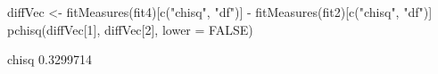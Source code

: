 \begin{Schunk}
\begin{Sinput}
 diffVec <- fitMeasures(fit4)[c("chisq", "df")] -
     fitMeasures(fit2)[c("chisq", "df")]
 pchisq(diffVec[1], diffVec[2], lower = FALSE)
\end{Sinput}
\begin{Soutput}
    chisq 
0.3299714 
\end{Soutput}
\end{Schunk}
